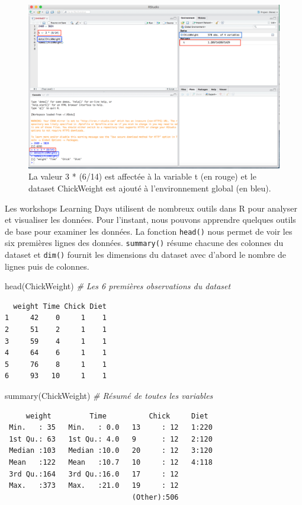 \documentclass[
  12pt,
]{book}
\newenvironment{Shaded}{\begin{snugshade}}{\end{snugshade}}
\newcommand{\CommentTok}[1]{\textcolor[rgb]{0.56,0.35,0.01}{\textit{#1}}}
\newcommand{\FunctionTok}[1]{\textcolor[rgb]{0.00,0.00,0.00}{#1}}
\newcommand{\NormalTok}[1]{#1}
\begin{document}
\begin{figure}
\includegraphics[width=0.6\linewidth]{Images/save_data} \caption{La valeur 3 * (6/14) est affectée à la variable t (en rouge) et le dataset ChickWeight est ajouté à l'environnement global (en bleu).}\label{fig:savedata}
\end{figure}

Les workshops Learning Days utilisent de nombreux outils dans R pour analyser et visualiser les données. Pour l'instant, nous pouvons apprendre quelques outils de base pour examiner les données. La fonction \texttt{head()} nous permet de voir les six premières lignes des données. \texttt{summary()} résume chacune des colonnes du dataset et \texttt{dim()} fournit les dimensions du dataset avec d'abord le nombre de lignes puis de colonnes.

\begin{Shaded}
\begin{Highlighting}[]
\FunctionTok{head}\NormalTok{(ChickWeight) }\CommentTok{\# Les 6 premières observations du dataset}
\end{Highlighting}
\end{Shaded}

\begin{verbatim}
  weight Time Chick Diet
1     42    0     1    1
2     51    2     1    1
3     59    4     1    1
4     64    6     1    1
5     76    8     1    1
6     93   10     1    1
\end{verbatim}

\begin{Shaded}
\begin{Highlighting}[]
\FunctionTok{summary}\NormalTok{(ChickWeight) }\CommentTok{\# Résumé de toutes les variables}
\end{Highlighting}
\end{Shaded}

\begin{verbatim}
     weight         Time          Chick     Diet   
 Min.   : 35   Min.   : 0.0   13     : 12   1:220  
 1st Qu.: 63   1st Qu.: 4.0   9      : 12   2:120  
 Median :103   Median :10.0   20     : 12   3:120  
 Mean   :122   Mean   :10.7   10     : 12   4:118  
 3rd Qu.:164   3rd Qu.:16.0   17     : 12          
 Max.   :373   Max.   :21.0   19     : 12          
                              (Other):506          
\end{verbatim}
\end{document}
